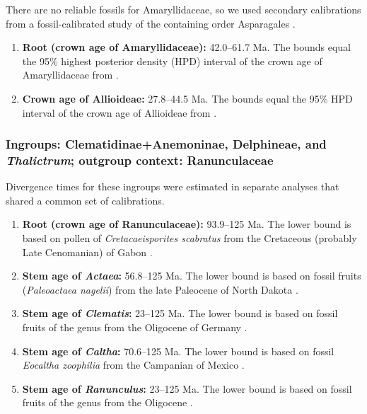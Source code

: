 \noindent There are no reliable fossils for Amaryllidaceae, so we used
secondary calibrations from a fossil-calibrated study of the
containing order Asparagales \citep{Chen2013}.

\begin{enumerate}

\item \textbf{Root (crown age of Amaryllidaceae):} 42.0--61.7 Ma. The
  bounds equal the 95\% highest posterior density (HPD) interval of
  the crown age of Amaryllidaceae from \cite{Chen2013}.

\item \textbf{Crown age of Allioideae:} 27.8--44.5 Ma. The bounds
  equal the 95\% HPD interval of the crown age of Allioideae from
  \cite{Chen2013}.

\end{enumerate}

\subsubsection*{Ingroups: Clematidinae+Anemoninae, Delphineae, and
  \textit{Thalictrum}; outgroup context: Ranunculaceae}

Divergence times for these ingroups were estimated in separate
analyses that shared a common set of calibrations.

\begin{enumerate}
\item \textbf{Root (crown age of Ranunculaceae):} 93.9--125 Ma. The
  lower bound is based on pollen of \textit{Cretacaeisporites
    scabratus} from the Cretaceous (probably Late Cenomanian) of Gabon
  \citep{Ward1994}.

\item \textbf{Stem age of \textit{Actaea}:} 56.8--125 Ma. The lower
  bound is based on fossil fruits (\textit{Paleoactaea nagelii}) from
  the late Paleocene of North Dakota \citep{Pigg2005}.

\item \textbf{Stem age of \textit{Clematis}:} 23--125 Ma. The lower
  bound is based on fossil fruits of the genus from the Oligocene of
  Germany \citep{Weyland1938}.

\item \textbf{Stem age of \textit{Caltha}:} 70.6--125 Ma. The lower
  bound is based on fossil \textit{Eocaltha zoophilia} from the
  Campanian of Mexico \citep{Rodriguez1998}.

\item \textbf{Stem age of \textit{Ranunculus}:} 23--125 Ma. The
  lower bound is based on fossil fruits of the genus from the
  Oligocene \citep{Mai1985}.

\end{enumerate}

